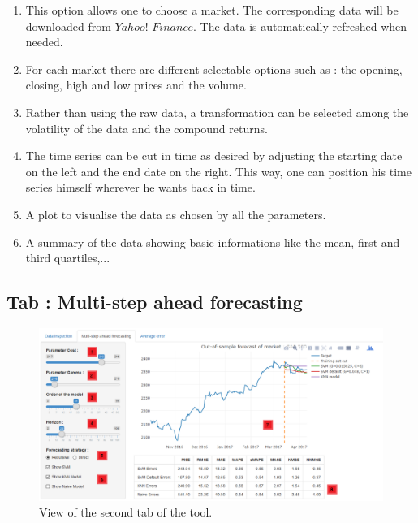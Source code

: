 \documentclass[11pt,a4paper,oneside]{book}
\begin{document}
\begin{enumerate}
\item This option allows one to choose a market. The corresponding data will be downloaded from $Yahoo!$ $Finance$. The data is automatically refreshed when needed.
\item For each market there are different selectable options such as : the opening, closing, high and low prices and the volume.
\item Rather than using the raw data, a transformation can be selected among the volatility of the data and the compound returns.
\item The time series can be cut in time as desired by adjusting the starting date on the left and the end date on the right. This way, one can position his time series himself wherever he wants back in time.
\item A plot to visualise the data as chosen by all the parameters.
\item A summary of the data showing basic informations like the mean, first and third quartiles,...
\end{enumerate}


\subsection{Tab : Multi-step ahead forecasting}

\begin{figure}[!h]
  \centering
    \includegraphics[scale=0.44]{img/tab2.png}
  \caption{View of the second tab of the tool.}
  \label{fig:tool2}
\end{figure}
\end{document}
